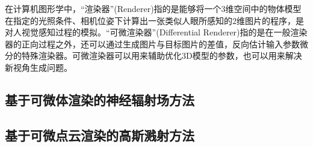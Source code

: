 在计算机图形学中，“渲染器”(Renderer)指的是能够将一个3维空间中的物体模型在指定的光照条件、相机位姿下计算出一张类似人眼所感知的2维图片的程序，是对人视觉感知过程的模拟。“可微渲染器”(Differential Renderer)指的是在一般渲染器的正向过程之外，还可以通过生成图片与目标图片的差值，反向估计输入参数微分的特殊渲染器。可微渲染器可以用来辅助优化3D模型的参数，也可以用来解决新视角生成问题。

\subsection{基于可微体渲染的神经辐射场方法}


\subsection{基于可微点云渲染的高斯溅射方法}

